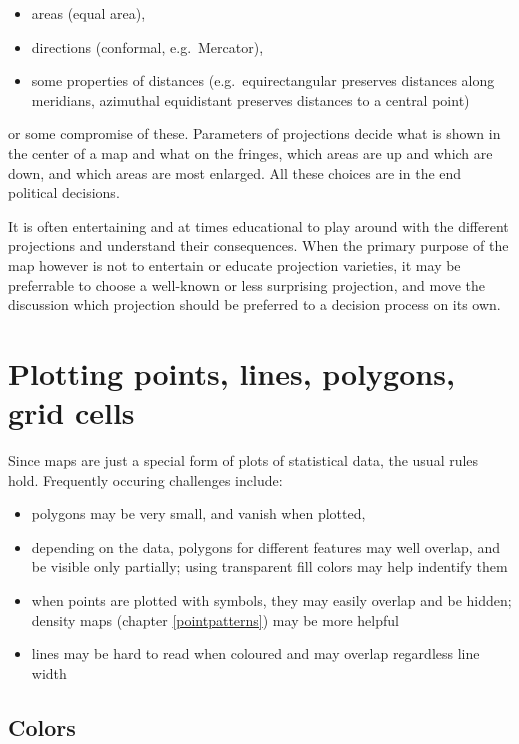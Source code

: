 \documentclass[]{book}
\providecommand{\tightlist}{%
  \setlength{\itemsep}{0pt}\setlength{\parskip}{0pt}}
\begin{document}
\begin{itemize}
\tightlist
\item
  areas (equal area),
\item
  directions (conformal, e.g.~Mercator),
\item
  some properties of distances (e.g.~equirectangular preserves distances along meridians, azimuthal equidistant preserves distances to a central point)
\end{itemize}

or some compromise of these. Parameters of projections decide what
is shown in the center of a map and what on the fringes, which
areas are up and which are down, and which areas are most enlarged.
All these choices are in the end political decisions.

It is often entertaining and at times educational to play around with
the different projections and understand their consequences. When
the primary purpose of the map however is not to entertain or educate
projection varieties, it may be preferrable to choose a well-known or
less surprising projection, and move the discussion which projection
should be preferred to a decision process on its own.

\hypertarget{plotting-points-lines-polygons-grid-cells}{%
\section{Plotting points, lines, polygons, grid cells}\label{plotting-points-lines-polygons-grid-cells}}

Since maps are just a special form of plots of statistical data,
the usual rules hold. Frequently occuring challenges include:

\begin{itemize}
\tightlist
\item
  polygons may be very small, and vanish when plotted,
\item
  depending on the data, polygons for different features may well
  overlap, and be visible only partially; using transparent fill
  colors may help indentify them
\item
  when points are plotted with symbols, they may easily overlap and be hidden; density maps (chapter \ref{pointpatterns}) may be more helpful
\item
  lines may be hard to read when coloured and may overlap regardless line width
\end{itemize}

\hypertarget{colors}{%
\subsection{Colors}\label{colors}}
\end{document}
